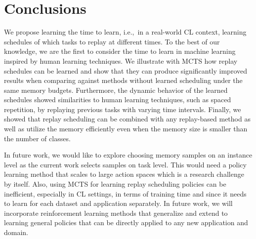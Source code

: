 
\section{Conclusions}\label{sec:conclusions}

We propose learning the time to learn, i.e.,~in a real-world CL context, learning schedules of which tasks to replay at different times. %
To the best of our knowledge, we are the first to consider the time to learn in machine learning inspired by human learning techniques. 
We illustrate with MCTS how replay schedules can be learned and show that they can produce significantly improved results when comparing against methods without learned scheduling under the same memory budgets.
Furthermore, the dynamic behavior of the learned schedules showed similarities to human learning techniques, such as spaced repetition, by replaying previous tasks with varying time intervals.  
Finally, we showed that replay scheduling can be combined with any replay-based method as well as utilize the memory efficiently even when the memory size is smaller than the number of classes. %


In future work, we would like to explore choosing memory samples on an instance level as the current work selects samples on task level. 
This would need a policy learning method that scales to large action spaces which is a research challenge by itself. 
Also, using MCTS for learning replay scheduling policies can be inefficient, %
especially in CL settings, 
in terms of training time and since it needs to learn for each dataset and application separately. 
In future work, we will incorporate reinforcement learning methods that generalize and extend to learning general policies that can be directly applied to any new application and domain.

